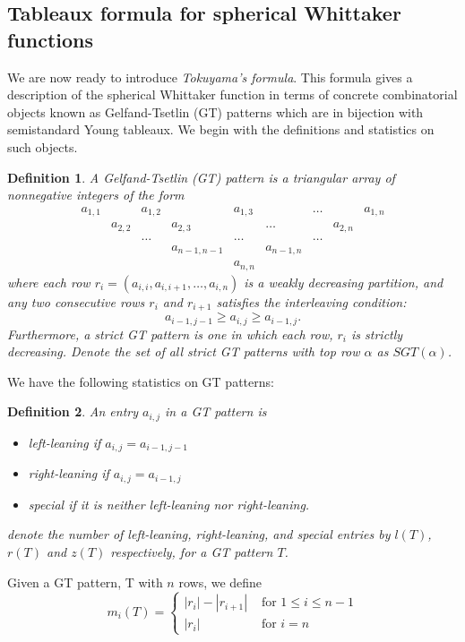 \documentclass[11pt]{amsart}
\newtheorem{definition}{Definition}[section]
\begin{document}
{\subsection{Tableaux formula for spherical Whittaker functions}
 We are now ready to introduce \emph{Tokuyama's formula}. This formula gives a description of the spherical Whittaker function in terms of concrete combinatorial objects known as Gelfand-Tsetlin (GT) patterns which are in bijection with semistandard Young tableaux. We begin with the definitions and statistics on such objects.
\begin{definition}\cite{G}
A Gelfand-Tsetlin (GT) pattern is a triangular array of nonnegative integers of the form 
\[
\begin{matrix}
a_{1,1}& & a_{1,2} & & a_{1,3} & & \ldots & & a_{1,n} \\
& a_{2,2}& & a_{2,3} & & \ldots& & a_{2,n}\\
& & \ldots& & \ldots & & \ldots\\
& & & a_{n-1,n-1} & & a_{n-1,n}\\
& & & & a_{n,n}
\end{matrix}
\]
where each row $r_{i}=(a_{i,i},a_{i,i+1},\ldots,a_{i,n})$ is a weakly decreasing partition, and any two consecutive rows $r_{i}$ and $r_{i+1}$ satisfies the interleaving condition:
\[
a_{i-1,j-1}\geq a_{i,j} \geq a_{i-1,j}.
\]
Furthermore, a \emph{strict} GT pattern is one in which each row, $r_{i}$ is strictly decreasing. Denote the set of all strict GT patterns with top row $\alpha$ as $SGT(\alpha)$. 
\end{definition} 
We have the following statistics on GT patterns:
\begin{definition} An entry $a_{i,j}$ in a GT pattern is 
\begin{itemize}
\item \emph{left-leaning} if $a_{i,j}=a_{i-1,j-1}$
\item \emph{right-leaning} if $a_{i,j}=a_{i-1,j}$
\item \emph{special} if it is neither left-leaning nor right-leaning. 
\end{itemize}
denote the number of left-leaning, right-leaning, and special entries by $l(T)$, $r(T)$ and $z(T)$ respectively, for a GT pattern $T$.  
\end{definition}
Given a GT pattern, T with $n$ rows, we define
\[
m_{i}(T)=\begin{cases}
|r_{i}|-|r_{i+1}| & \text{ for } 1\leq i \leq n-1 \\
|r_{i}| & \text{ for } i=n

\end{cases}\]}
\end{document}
